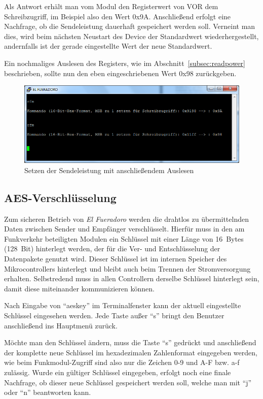\documentclass[paper=a4, parskip, numbers=noenddot, toc=listof, headsepline]{scrbook}
\newcommand{\anlage}{\emph{El Fueradoro}}
\begin{document}
				  Als Antwort erhält man vom Modul den Registerwert von VOR dem Schreibzugriff, im Beispiel also den Wert 0x9A. Anschließend erfolgt eine Nachfrage, ob die Sendeleistung dauerhaft gespeichert werden soll. Verneint man dies, wird beim nächsten Neustart des Device der Standardwert wiederhergestellt, andernfalls ist der gerade eingestellte Wert der neue Standardwert.

				  Ein nochmaliges Auslesen des Registers, wie im Abschnitt~\ref{subsec:readpower} beschrieben, sollte nun den eben eingeschriebenen Wert 0x98 zurückgeben.

				  \begin{figure}
					  \centering
					  \includegraphics[width=.8\textwidth]{Bilder/rfmbefehl2}
					  \caption{Setzen der Sendeleistung mit anschließendem Auslesen}
					  \label{fig:rfmwrite}
				  \end{figure}


		  \subsection{AES-Verschlüsselung}
			  \label{sec:encryption}

			  Zum sicheren Betrieb von {\anlage} werden die drahtlos zu übermittelnden Daten zwischen Sender und Empfänger verschlüsselt. Hierfür muss in den am Funkverkehr beteiligten Modulen ein Schlüssel mit einer Länge von 16~Bytes (128~Bit) hinterlegt werden, der für die Ver- und Entschlüsselung der Datenpakete genutzt wird. Dieser Schlüssel ist im internen Speicher des Mikrocontrollers hinterlegt und bleibt auch beim Trennen der Stromversorgung erhalten. Selbstredend muss in allen Controllern derselbe Schlüssel hinterlegt sein, damit diese miteinander kommunizieren können.

			  Nach Eingabe von \enquote{aeskey} im Terminalfenster kann der aktuell eingestellte Schlüssel eingesehen werden. Jede Taste außer \enquote{s} bringt den Benutzer anschließend ins Hauptmenü zurück.

			  Möchte man den Schlüssel ändern, muss die Taste \enquote{s} gedrückt und anschließend der komplette neue Schlüssel im hexadezimalen Zahlenformat eingegeben werden, wie beim Funkmodul-Zugriff sind also nur die Zeichen 0-9 und A-F bzw. a-f zulässig. Wurde ein gültiger Schlüssel eingegeben, erfolgt noch eine finale Nachfrage, ob dieser neue Schlüssel gespeichert werden soll, welche man mit \enquote{j} oder \enquote{n} beantworten kann.
			  \clearpage
\end{document}

